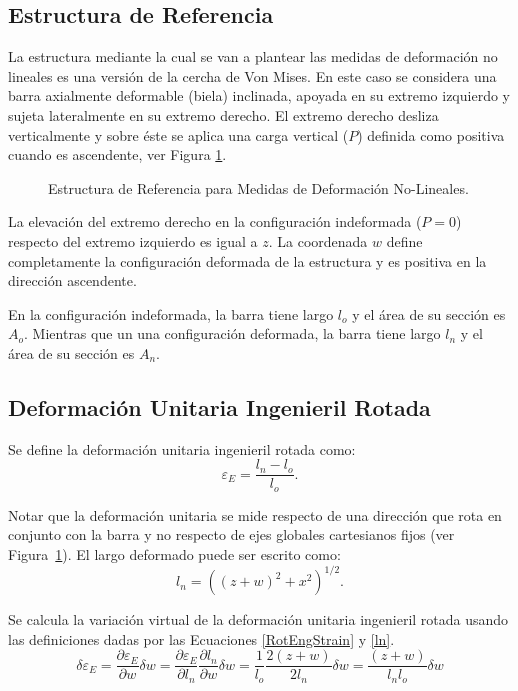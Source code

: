\subsection{Estructura de Referencia} \label{sec:cerchamises}

La estructura mediante la cual se van a plantear las medidas de deformación no lineales es una versión de la cercha de Von Mises. En este caso se considera una barra axialmente deformable (biela) inclinada, apoyada en su extremo izquierdo y sujeta lateralmente en su extremo derecho. El extremo derecho desliza verticalmente y sobre éste se aplica una carga vertical ($P$) definida como positiva cuando es ascendente, ver Figura \ref{fig:nonlinstrainm}.

\begin{figure}[htb]
	\centering
	\def\svgwidth{0.6\textwidth}
	
	\caption{Estructura de Referencia para Medidas de Deformación No-Lineales.}
	\label{fig:nonlinstrainm}
\end{figure}

La elevación del extremo derecho en la configuración indeformada ($P=0$) respecto del extremo izquierdo es igual a $z$. La coordenada $w$ define completamente la configuración deformada de la estructura y es positiva en la dirección ascendente.

En la configuración indeformada, la barra tiene largo $l_o$ y el área de su sección es $A_o$. Mientras que un una configuración deformada, la barra tiene largo $l_n$ y el área de su sección es $A_n$.

\subsection{Deformación Unitaria Ingenieril Rotada}

Se define la deformación unitaria ingenieril rotada como:
%
\begin{equation}\label{RotEngStrain}
	\varepsilon_E = \frac{l_n-l_o}{l_o}.
\end{equation}

Notar que la deformación unitaria se mide respecto de una dirección que rota en conjunto con la barra y no respecto de ejes globales cartesianos fijos (ver Figura~\ref{fig:nonlinstrainm}). El largo deformado puede ser escrito como:
%
\begin{equation}\label{ln}
	l_n = \left((z+w)^2+x^2\right)^{1/2}.
\end{equation}

Se calcula la variación virtual de la deformación unitaria ingenieril rotada usando las definiciones dadas por las Ecuaciones \eqref{RotEngStrain} y \eqref{ln}.
%
\begin{equation}\label{VirtEngStrain}
	\delta \varepsilon_E = \frac{\partial \varepsilon_E}{\partial w} \delta w = \frac{\partial \varepsilon_E}{\partial l_n}\frac{\partial l_n}{\partial w}\delta w =	\frac{1}{l_o}\frac{2(z+w)}{2l_n}\delta w = \frac{(z+w)}{l_n l_o}\delta w
\end{equation}

